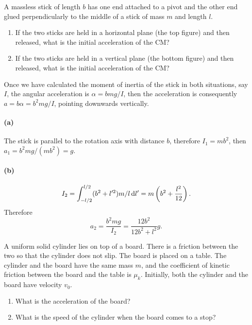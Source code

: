 \documentclass{article}
\begin{document}
\begin{problem}
A massless stick of length $b$ has one end attached to a pivot and the other end glued perpendicularly to the middle of a stick of mass $m$ and length $l$.
\begin{enumerate}
  \item[(a)] If the two sticks are held in a horizontal plane (the top figure) and then released, what is the initial acceleration of the CM?
  \item[(b)] If the two sticks are held in a vertical plane (the bottom figure) and then released, what is the initial acceleration of the CM?
\end{enumerate}
\begin{center}
  
\end{center}
\end{problem}

\begin{solution}
	Once we have calculated the moment of inertia of the stick in both situations, say $I$, the angular acceleration is $\alpha = bmg/I$, then the acceleration is consequently $a = b\alpha = b^2mg/I$, pointing downwards vertically.

	\paragraph{(a)} The stick is parallel to the rotation axis with distance $b$, therefore $I_1 = mb^2$, then $a_1 = b^2mg/(mb^2) = g$.

	\paragraph{(b)}
	\[ I_2 = \int_{-l/2}^{l/2} (b^2 + l'^2) m/l \,\mathrm{d} l' = m \left( b^2 + \frac{l^2}{12} \right). \]
	Therefore
	\[ a_2  =\frac{b^2 mg}{I_2} = \frac{12 b^2}{12 b^2 + l^2} g. \]
\end{solution}



\begin{problem}
A uniform solid cylinder lies on top of a board. There is a friction between the two so that the cylinder does not slip. The board is placed on a table. The cylinder and the board have the same mass $m$, and the coefficient of kinetic friction between the board and the table is $\mu_k$. Initially, both the cylinder and the board have velocity $v_0$.
\begin{enumerate}
  \item[(a)] What is the acceleration of the board?
  \item[(b)] What is the speed of the cylinder when the board comes to a stop?
\end{enumerate}
\begin{center}
  
\end{center}
\end{problem}
\end{document}
